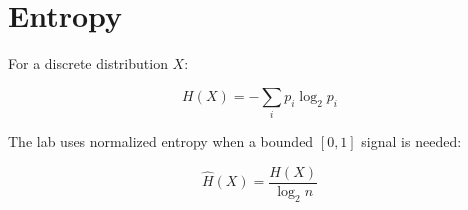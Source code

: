 \section{Entropy}

For a discrete distribution $X$:

\[
H(X) = - \sum_i p_i \log_2 p_i
\]

The lab uses normalized entropy when a bounded $[0,1]$ signal is needed:

\[
\hat{H}(X) = \frac{H(X)}{\log_2 n}
\]

